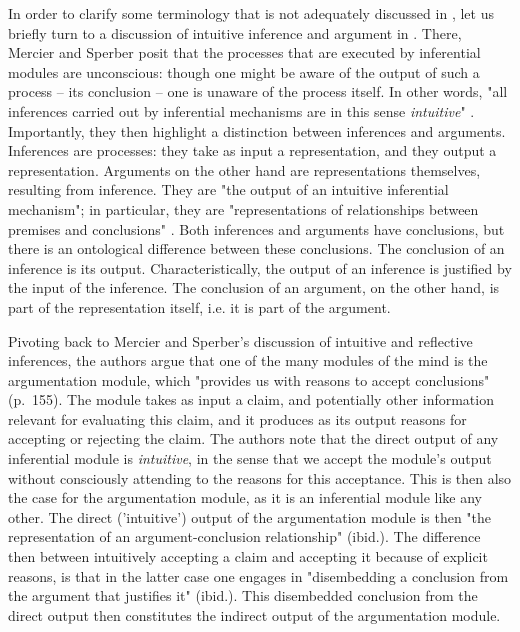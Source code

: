 In order to clarify some terminology that is not adequately discussed in \citet{MS09}, let us briefly turn to a discussion of intuitive inference and argument in \citet[\S 1.1]{MS11}.
There, Mercier and Sperber posit that the processes that are executed by inferential modules are unconscious: though one might be aware of the output of such a process -- its conclusion -- one is unaware of the process itself. In other words, "all inferences carried out by inferential mechanisms are in this sense \emph{intuitive}" \citep[p.~58]{MS11}.
Importantly, they then highlight a distinction between inferences and arguments.
Inferences are processes: they take as input a representation, and they output a representation.
Arguments on the other hand are representations themselves, resulting from inference. They are "the output of an intuitive inferential mechanism"; in particular, they are "representations of relationships between premises and conclusions" \citep[p.~58]{MS11}.
Both inferences and arguments have conclusions, but there is an ontological difference between these conclusions.
The conclusion of an inference is its output. Characteristically, the output of an inference is justified by the input of the inference.
The conclusion of an argument, on the other hand, is part of the representation itself, i.e. it is part of the argument.

Pivoting back to Mercier and Sperber's \citeyear{MS09} discussion of intuitive and reflective inferences,
the authors argue that one of the many modules of the mind is the argumentation module, which "provides us with reasons to accept conclusions" (p.~155). The module takes as input a claim, and potentially other information relevant for evaluating this claim, and it produces as its output reasons for accepting or rejecting the claim.
The authors note that the direct output of any inferential module is \emph{intuitive}, in the sense that we accept the module's output without consciously attending to the reasons for this acceptance. This is then also the case for the argumentation module, as it is an inferential module like any other. The direct ('intuitive') output of the argumentation module is then "the representation of an argument-conclusion relationship" (ibid.).
The difference then between intuitively accepting a claim and accepting it because of explicit reasons, is that in the latter case one engages in "disembedding a conclusion from the argument that justifies it" (ibid.).
This disembedded conclusion from the direct output then constitutes the indirect output of the argumentation module.

